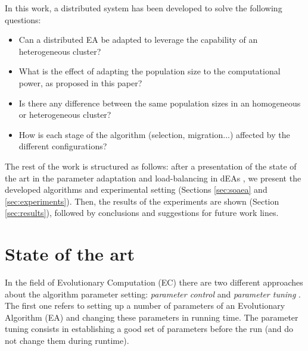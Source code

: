 \documentclass[final,1p,times]{elsarticle}
\begin{document}
In this work, a distributed system has been developed to solve the following questions:
\begin{itemize}
 \item Can a distributed EA be adapted to leverage the capability of an heterogeneous cluster?
 \item What is the effect of adapting the population size to the computational power, as proposed in this paper? %
 \item Is there any difference between the same population sizes in an homogeneous or heterogeneous cluster?
 \item How is each stage of the algorithm (selection, migration...) affected by the different
   configurations? %
\end{itemize}


The rest of the work is structured as follows: after a presentation of
the state of
the art in the parameter adaptation and load-balancing in dEAs %
, we present the developed algorithms and experimental setting (Sections \ref{sec:soaea} and \ref{sec:experiments}). 
Then, the results of the experiments are shown (Section \ref{sec:results}), followed by conclusions and suggestions for future work lines.


%
\section{State of the art}
\label{sec:soa}
%

In the field of  Evolutionary Computation (EC) there are two different approaches about the algorithm parameter setting: {\em parameter control} and {\em parameter tuning} \cite{PARAMETERTUNING}. The first one refers to setting up a number of parameters of an Evolutionary Algorithm (EA) and changing these parameters in running time. The parameter tuning consists in establishing a good set of parameters before the run (and do not change them during runtime).
\end{document}
